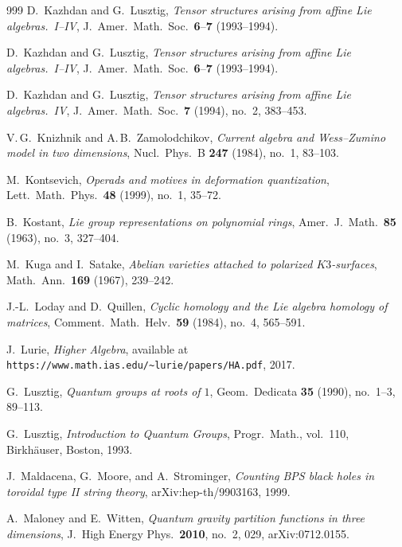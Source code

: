 \documentclass[11pt]{memoir}
\begin{document}
\begin{thebibliography}{999}
D.~Kazhdan and G.~Lusztig, \emph{Tensor structures arising from affine Lie algebras.~I--IV}, J.~Amer.\ Math.\ Soc.\ \textbf{6}--\textbf{7} (1993--1994).

D.~Kazhdan and G.~Lusztig, \emph{Tensor structures arising from affine Lie algebras.~I--IV}, J.~Amer.\ Math.\ Soc.\ \textbf{6}--\textbf{7} (1993--1994).

D.~Kazhdan and G.~Lusztig, \emph{Tensor structures arising from affine Lie algebras.~IV}, J.~Amer.\ Math.\ Soc.\ \textbf{7} (1994), no.~2, 383--453.

V.\,G.~Knizhnik and A.\,B.~Zamolodchikov, \emph{Current algebra and Wess--Zumino model in two dimensions}, Nucl.\ Phys.\ B \textbf{247} (1984), no.~1, 83--103.

M.~Kontsevich, \emph{Operads and motives in deformation quantization}, Lett.\ Math.\ Phys.\ \textbf{48} (1999), no.~1, 35--72.

B.~Kostant, \emph{Lie group representations on polynomial rings}, Amer.\ J.\ Math.\ \textbf{85} (1963), no.~3, 327--404.

M.~Kuga and I.~Satake, \emph{Abelian varieties attached to polarized $K3$-surfaces}, Math.\ Ann.\ \textbf{169} (1967), 239--242.

J.-L.~Loday and D.~Quillen, \emph{Cyclic homology and the Lie algebra homology of matrices}, Comment.\ Math.\ Helv.\ \textbf{59} (1984), no.~4, 565--591.

J.~Lurie, \emph{Higher Algebra}, available at \texttt{https://www.math.ias.edu/\~{}lurie/papers/HA.pdf}, 2017.

G.~Lusztig, \emph{Quantum groups at roots of $1$}, Geom.\ Dedicata \textbf{35} (1990), no.~1--3, 89--113.

G.~Lusztig, \emph{Introduction to Quantum Groups}, Progr.\ Math., vol.~110, Birkh\"auser, Boston, 1993.

J.~Maldacena, G.~Moore, and A.~Strominger, \emph{Counting BPS black holes in toroidal type II string theory}, arXiv:hep-th/9903163, 1999.

A.~Maloney and E.~Witten, \emph{Quantum gravity partition functions in three dimensions}, J.\ High Energy Phys.\ \textbf{2010}, no.~2, 029, arXiv:0712.0155.


\end{thebibliography}
\end{document}
